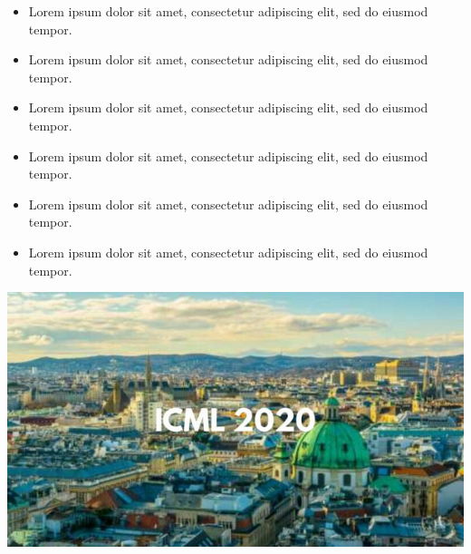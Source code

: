 \documentclass[landscape,a0paper,fontscale=0.285]{baposter} %
\newcommand{\compresslist}{ %
\setlength{\itemsep}{1pt}
\setlength{\parskip}{0pt}
\setlength{\parsep}{0pt}
}
\begin{document}
\begin{poster}
{%

\begin{multicols}{2}

\vspace{1em}

\begin{itemize}\compresslist
\item Lorem ipsum dolor sit amet, consectetur adipiscing elit, sed do eiusmod tempor.
\item Lorem ipsum dolor sit amet, consectetur adipiscing elit, sed do eiusmod tempor.
\item Lorem ipsum dolor sit amet, consectetur adipiscing elit, sed do eiusmod tempor.
\item Lorem ipsum dolor sit amet, consectetur adipiscing elit, sed do eiusmod tempor.
\item Lorem ipsum dolor sit amet, consectetur adipiscing elit, sed do eiusmod tempor.
\item Lorem ipsum dolor sit amet, consectetur adipiscing elit, sed do eiusmod tempor.
\end{itemize}


\end{multicols}


\begin{multicols}{2}

\vspace{1em}

\begin{center}
\includegraphics[width=0.9\linewidth]{image-example.jpg}
\end{center}


\end{multicols}}
\end{poster}
\end{document}
